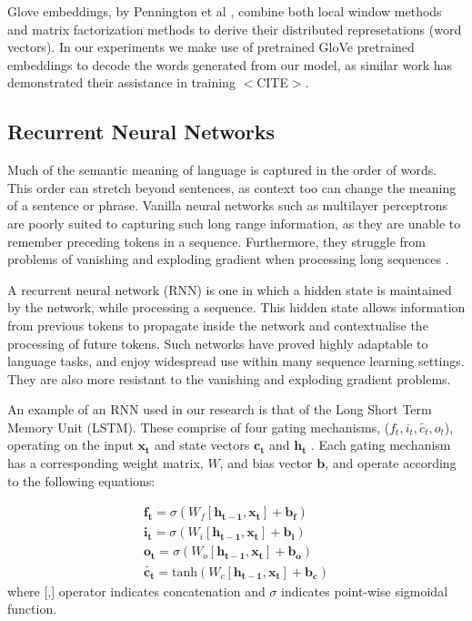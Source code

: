 Glove embeddings, by Pennington et al \cite{pennington_glove_2014}, combine both local window methods and matrix factorization methods to derive their distributed represetations (word vectors).  
In our experiments we make use of pretrained GloVe pretrained embeddings to decode the words generated from our model, as similar work has demonstrated their assistance in training $<$CITE$>$.

\subsection{Recurrent Neural Networks} %
\label{sub:recurrent_neural_networks}

Much of the semantic meaning of language is captured in the order of words. 
This order can stretch beyond sentences, as context too can change the meaning of a sentence or phrase.
Vanilla neural networks such as multilayer perceptrons are poorly suited to capturing such long range information, as they are unable to remember preceding tokens in a sequence. 
Furthermore, they struggle from problems of vanishing and exploding gradient when processing long sequences \cite{bengio_learning_1994}.

A recurrent neural network (RNN) is one in which a hidden state is maintained by the network, while processing a sequence.
This hidden state allows information from previous tokens to propagate inside the network and contextualise the processing of future tokens.
Such networks have proved highly adaptable to language tasks, and enjoy widespread use within many sequence learning settings\cite{lipton_critical_2015}. They are also more resistant to the vanishing and exploding gradient problems.

An example of an RNN used in our research is that of the Long Short Term Memory Unit (LSTM)\cite{hochreiter_long_1997}. These comprise of four gating mechanisms, ($f_t, i_t,\tilde{c_t}, o_t$), operating on the input $\mathbf{x_t}$ and state vectors $\mathbf{c_t}$ and $\mathbf{h_t}$
\cite{noauthor_understanding_nodate}. Each gating mechanism has a corresponding weight matrix, $W$, and bias vector $\mathbf{b}$, and operate according to the following equations:

\begin{align}
    \mathbf{f_t} = \sigma(W_f [\mathbf{h_{t-1}}, \mathbf{x_t}] + \mathbf{b_f})\label{eq:lstm1}\\
    \mathbf{i_t} = \sigma(W_i [\mathbf{h_{t-1}}, \mathbf{x_t}] + \mathbf{b_i}) \label{eq:lstm2}\\
    \mathbf{o_t} = \sigma(W_o [\mathbf{h_{t-1}}, \mathbf{x_t}] + \mathbf{b_o}) \label{eq:lstm3}\\
    \mathbf{\tilde{c_t}} = \text{tanh}(W_c [\mathbf{h_{t-1}}, \mathbf{x_t}] + \mathbf{b_c}) \label{eq:lstm4}
\end{align}
where [,] operator indicates concatenation and $\sigma$ indicates point-wise sigmoidal function.

